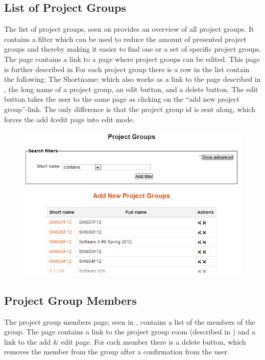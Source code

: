 \subsection{List of Project Groups}
\label{sec:preListPg}
The list of project groups, seen on  provides an overview of all project groups. 
It contains a filter which can be used to reduce the amount of presented project groups and thereby making it easier to find one or a set of specific project groups. 
The page contains a link to a page where project groups can be edited. 
This page is further described in 
For each project group there is a row in the list contain the following: The Shortname; which also works as a link to the page described in , the long name of a project group, an edit button, and a delete button. 
The edit button takes the user to the same page as clicking on the ``add new project group''-link. 
The only difference is that the project group id is sent along, which forces the add \&edit page into edit mode. 

\begin{figure}
	\centering
		\includegraphics[width=\textwidth]{images/moodleadminprojectgrouplist.png}
	\label{fig:moodleadminprojectgrouplist}
\end{figure}


\FloatBarrier

\subsection{Project Group Members}
\label{sec:projectGrpMem}
The project group members page, seen in , contains a list of the members of the group. 
The page contains a link to the project group room (described in \secref{}) and a link to the add \& edit page. 
For each member there is a delete button, which removes the member from the group after a confirmation from the user.

